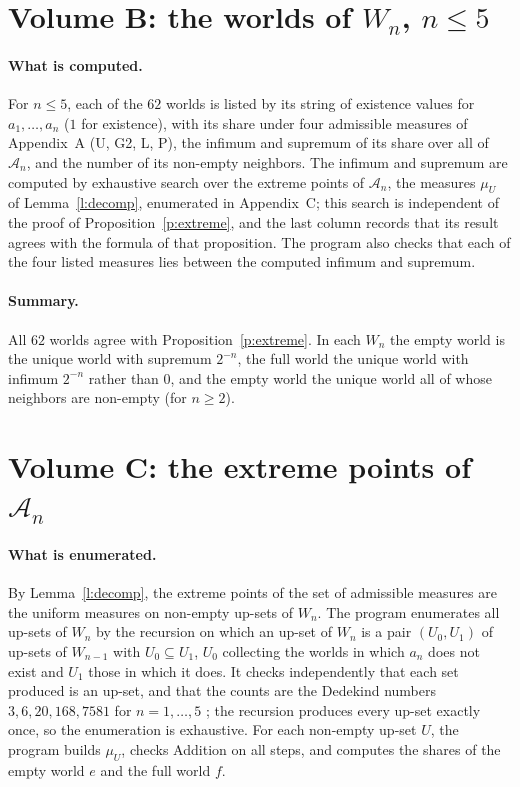 \documentclass{situationist-preprint}
\begin{document}


\section{Volume B: the worlds of \texorpdfstring{$W_n$}{W\_n}, \texorpdfstring{$n \leq 5$}{n <= 5}}\label{app:b}

\paragraph{What is computed.} For $n \leq 5$, each of the $62$ worlds is listed by its string of existence values for $a_1, \ldots, a_n$ ($1$ for existence), with its share under four admissible measures of Appendix~A (U, G2, L, P), the infimum and supremum of its share over all of $\mathcal{A}_n$, and the number of its non-empty neighbors. The infimum and supremum are computed by exhaustive search over the extreme points of $\mathcal{A}_n$, the measures $\mu_U$ of Lemma~\ref{l:decomp}, enumerated in Appendix~C; this search is independent of the proof of Proposition~\ref{p:extreme}, and the last column records that its result agrees with the formula of that proposition. The program also checks that each of the four listed measures lies between the computed infimum and supremum.

\paragraph{Summary.} All $62$ worlds agree with Proposition~\ref{p:extreme}. In each $W_n$ the empty world is the unique world with supremum $2^{-n}$, the full world the unique world with infimum $2^{-n}$ rather than $0$, and the empty world the unique world all of whose neighbors are non-empty (for $n \geq 2$).



\section{Volume C: the extreme points of \texorpdfstring{$\mathcal{A}_n$}{A\_n}}\label{app:c}

\paragraph{What is enumerated.} By Lemma~\ref{l:decomp}, the extreme points of the set of admissible measures are the uniform measures on non-empty up-sets of $W_n$. The program enumerates all up-sets of $W_n$ by the recursion on which an up-set of $W_n$ is a pair $(U_0, U_1)$ of up-sets of $W_{n-1}$ with $U_0 \subseteq U_1$, $U_0$ collecting the worlds in which $a_n$ does not exist and $U_1$ those in which it does. It checks independently that each set produced is an up-set, and that the counts are the Dedekind numbers $3, 6, 20, 168, 7581$ for $n = 1, \ldots, 5$ \citep{Kleitman1969}; the recursion produces every up-set exactly once, so the enumeration is exhaustive. For each non-empty up-set $U$, the program builds $\mu_U$, checks Addition on all steps, and computes the shares of the empty world $e$ and the full world $f$.
\end{document}

